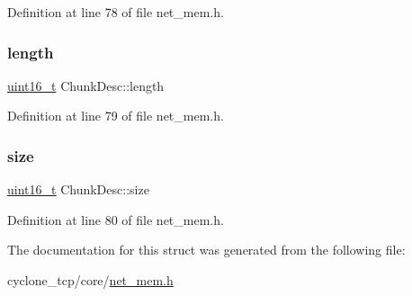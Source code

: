 Definition at line 78 of file net\+\_\+mem.\+h.

\mbox{\label{structChunkDesc_a4bdd57a9363511126fe5cd6d30c51c81}} 
\subsubsection{\texorpdfstring{length}{length}}
{\footnotesize\ttfamily \hyperlink{stdint_8h_a273cf69d639a59973b6019625df33e30}{uint16\+\_\+t} Chunk\+Desc\+::length}



Definition at line 79 of file net\+\_\+mem.\+h.

\mbox{\label{structChunkDesc_ab06232d65ee252651962c202651910c4}} 
\subsubsection{\texorpdfstring{size}{size}}
{\footnotesize\ttfamily \hyperlink{stdint_8h_a273cf69d639a59973b6019625df33e30}{uint16\+\_\+t} Chunk\+Desc\+::size}



Definition at line 80 of file net\+\_\+mem.\+h.



The documentation for this struct was generated from the following file\+:\begin{DoxyCompactItemize}
\item 
cyclone\+\_\+tcp/core/\hyperlink{net__mem_8h}{net\+\_\+mem.\+h}\end{DoxyCompactItemize}
